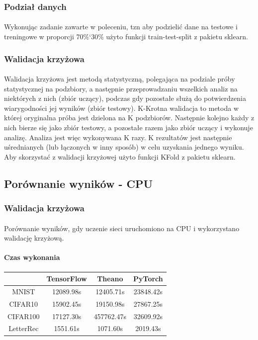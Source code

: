 \documentclass[a4paper,11pt]{article}
\begin{document}
\subsubsection{Podział danych}
\paragraph{}Wykonując zadanie zawarte w poleceniu, tzn aby podzielić dane na testowe i treningowe w proporcji 70\%{\char`\/}30\% użyto funkcji train-test-split z pakietu sklearn. 
\subsubsection{Walidacja krzyżowa}
\paragraph{}Walidacja krzyżowa jest metodą statystyczną, polegająca na podziale próby statystycznej na podzbiory, a następnie przeprowadzaniu wszelkich analiz na niektórych z nich (zbiór uczący), podczas gdy pozostałe służą do potwierdzenia wiarygodności jej wyników (zbiór testowy). K-Krotna walidacja to metoda w której oryginalna próba jest dzielona na K podzbiorów. Następnie kolejno każdy z nich bierze się jako zbiór testowy, a pozostałe razem jako zbiór uczący i wykonuje analizę. Analiza jest więc wykonywana K razy. K rezultatów jest następnie uśrednianych (lub łączonych w inny sposób) w celu uzyskania jednego wyniku. Aby skorzystać z walidacji krzyżowej użyto funkcji KFold z pakietu sklearn. 
\subsection{Porównanie wyników - CPU} 
\subsubsection{Walidacja krzyżowa}
\paragraph{}Porównanie wyników, gdy uczenie sieci uruchomiono na CPU i wykorzystano walidację krzyżową.
\paragraph{Czas wykonania}
\begin{tabular}{|c|c|c|c|}
\hline &TensorFlow & Theano & PyTorch \\ 
\hline MNIST &12089.98s &12405.71s  &23848.42s  \\ 
\hline CIFAR10 &15902.45s &19150.98s  &27867.25s  \\ 
\hline CIFAR100 &17127.30s &457762.47s  &32609.92s  \\ 
\hline LetterRec &1551.61s &1071.60s &2019.43s  \\ 
\hline
\end{tabular}
\end{document}
